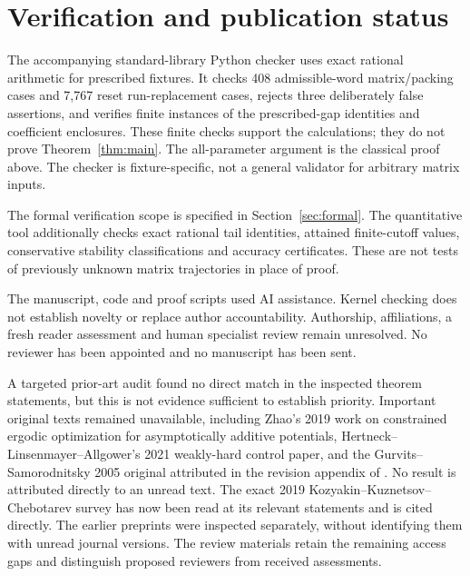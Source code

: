 \documentclass[11pt,letterpaper]{article}
\theoremstyle{remark}
\begin{document}
\section{Verification and publication status}\label{sec:status}

The accompanying standard-library Python checker uses exact rational
arithmetic for prescribed fixtures. It checks 408 admissible-word
matrix/packing cases and 7,767 reset run-replacement cases, rejects three
deliberately false assertions, and verifies finite instances of the
prescribed-gap identities and coefficient enclosures. These finite
checks support the calculations; they do not prove
Theorem~\ref{thm:main}. The all-parameter argument is the classical
proof above. The checker is fixture-specific, not a general validator
for arbitrary matrix inputs.

The formal verification scope is specified in Section~\ref{sec:formal}.
The quantitative tool additionally checks exact rational tail identities,
attained finite-cutoff values, conservative stability classifications and
accuracy certificates. These are not tests of previously unknown matrix
trajectories in place of proof.

The manuscript, code and proof scripts used AI assistance. Kernel checking
does not establish novelty or replace author accountability. Authorship,
affiliations, a fresh reader assessment and human specialist review remain
unresolved. No reviewer has been appointed and no manuscript has been sent.

A targeted prior-art audit found no direct match in the inspected
theorem statements, but this is not evidence sufficient to establish
priority. Important original texts remained unavailable, including
Zhao's 2019 work on constrained ergodic optimization for asymptotically
additive potentials, Hertneck--Linsenmayer--Allgower's 2021 weakly-hard
control paper, and the Gurvits--Samorodnitsky 2005 original attributed
in the revision appendix of \cite{ahmadi2012}. No result is attributed
directly to an unread text. The exact 2019 Kozyakin--Kuznetsov--Chebotarev survey has now been read at
its relevant statements and is cited directly. The earlier preprints
\cite{zhao2014,hertneck2020} were inspected separately, without identifying
them with unread journal versions. The review materials retain the remaining
access gaps and distinguish proposed reviewers from received assessments.

\begingroup
\raggedright


\endgroup
\end{document}
